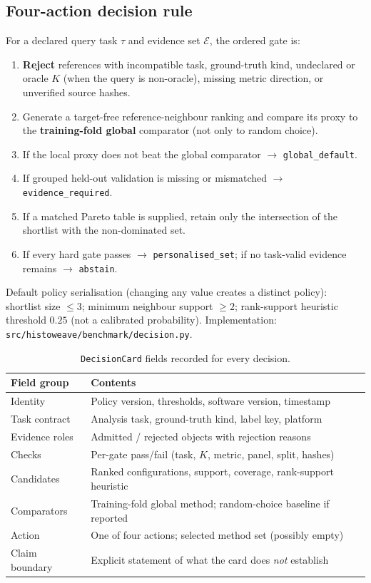 \documentclass[11pt]{article}
\begin{document}
\subsection{Four-action decision rule}

For a declared query task \(\tau\) and evidence set \(\mathcal{E}\), the
ordered gate is:

\begin{enumerate}
  \item \textbf{Reject} references with incompatible task, ground-truth kind,
        undeclared or oracle \(K\) (when the query is non-oracle), missing
        metric direction, or unverified source hashes.
  \item Generate a target-free reference-neighbour ranking and compare its
        proxy to the \textbf{training-fold global} comparator (not only to
        random choice).
  \item If the local proxy does not beat the global comparator $\rightarrow$
        \texttt{global\_default}.
  \item If grouped held-out validation is missing or mismatched $\rightarrow$
        \texttt{evidence\_required}.
  \item If a matched Pareto table is supplied, retain only the intersection of
        the shortlist with the non-dominated set.
  \item If every hard gate passes $\rightarrow$ \texttt{personalised\_set};
        if no task-valid evidence remains $\rightarrow$ \texttt{abstain}.
\end{enumerate}

Default policy serialisation (changing any value creates a distinct policy):
shortlist size $\le 3$; minimum neighbour support $\ge 2$; rank-support
heuristic threshold $0.25$ (not a calibrated probability). Implementation:
\texttt{src/histoweave/benchmark/decision.py}.

\begin{table}[ht]
\centering
\caption{\texttt{DecisionCard} fields recorded for every decision.
\label{tab:si-card}}
\begin{tabular}{@{}lp{}@{}}
\toprule
Field group & Contents \\
\midrule
Identity & Policy version, thresholds, software version, timestamp \\
Task contract & Analysis task, ground-truth kind, label key, platform \\
Evidence roles & Admitted / rejected objects with rejection reasons \\
Checks & Per-gate pass/fail (task, \(K\), metric, panel, split, hashes) \\
Candidates & Ranked configurations, support, coverage, rank-support heuristic \\
Comparators & Training-fold global method; random-choice baseline if reported \\
Action & One of four actions; selected method set (possibly empty) \\
Claim boundary & Explicit statement of what the card does \emph{not} establish \\
\bottomrule
\end{tabular}
\end{table}
\end{document}
